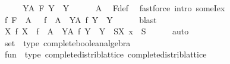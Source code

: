 \begin{isabellebody}
\ \ \isamarkupfalse%
\ \isamarkupfalse%
\ {\isachardoublequoteopen}{\isasymforall}Y{\isasymin}A{\isachardot}{\kern0pt}\ F\ Y\ {\isasymin}\ Y{\isachardoublequoteclose}\isanewline
\ \ \ \ \isamarkupfalse%
\ A\ \isamarkupfalse%
\ F{\isacharunderscore}{\kern0pt}def\ \isamarkupfalse%
\ {\isacharparenleft}{\kern0pt}fastforce\ intro{\isacharcolon}{\kern0pt}\ someI{}{\isacharunderscore}{\kern0pt}ex{\isacharparenright}{\kern0pt}\isanewline
\ \ \isamarkupfalse%
\ \isamarkupfalse%
\ {\isachardoublequoteopen}{\isasymexists}f{\isachardot}{\kern0pt}\ F\ {\isacharbackquote}{\kern0pt}\ A\ \ {\isacharequal}{\kern0pt}\ f\ {\isacharbackquote}{\kern0pt}\ A\ {\isasymand}\ {\isacharparenleft}{\kern0pt}{\isasymforall}Y{\isasymin}A{\isachardot}{\kern0pt}\ f\ Y\ {\isasymin}\ Y{\isacharparenright}{\kern0pt}{\isachardoublequoteclose}\isanewline
\ \ \ \ \isamarkupfalse%
\ blast\isanewline
\ \ \isamarkupfalse%
\ \isamarkupfalse%
\ {\isachardoublequoteopen}{\isasymexists}X{\isachardot}{\kern0pt}\ {\isacharparenleft}{\kern0pt}{\isasymexists}f{\isachardot}{\kern0pt}\ X\ {\isacharequal}{\kern0pt}\ f\ {\isacharbackquote}{\kern0pt}\ A\ {\isasymand}\ {\isacharparenleft}{\kern0pt}{\isasymforall}Y{\isasymin}A{\isachardot}{\kern0pt}\ f\ Y\ {\isasymin}\ Y{\isacharparenright}{\kern0pt}{\isacharparenright}{\kern0pt}\ {\isasymand}\ {\isacharparenleft}{\kern0pt}{\isasymforall}S{\isasymin}X{\isachardot}{\kern0pt}\ x\ {\isasymin}\ S{\isacharparenright}{\kern0pt}{\isachardoublequoteclose}\isanewline
\ \ \ \ \isamarkupfalse%
\ auto\isanewline
{}\isamarkupfalse%
%
\endisatagproof
{\isafoldproof}%
%
\isadelimproof
%
\endisadelimproof
\isanewline
{}\isamarkupfalse%
\isanewline
\isanewline
{}\isamarkupfalse%
\ set\ {\isacharcolon}{\kern0pt}{\isacharcolon}{\kern0pt}\ {\isacharparenleft}{\kern0pt}type{\isacharparenright}{\kern0pt}\ complete{\isacharunderscore}{\kern0pt}boolean{\isacharunderscore}{\kern0pt}algebra%
\isadelimproof
\ %
\endisadelimproof
%
\isatagproof
\isacommand{{\isachardot}{\kern0pt}{\isachardot}{\kern0pt}}\isamarkupfalse%
%
\endisatagproof
{\isafoldproof}%
%
\isadelimproof
%
\endisadelimproof
\isanewline
\isanewline
{}\isamarkupfalse%
\ {\isachardoublequoteopen}fun{\isachardoublequoteclose}\ {\isacharcolon}{\kern0pt}{\isacharcolon}{\kern0pt}\ {\isacharparenleft}{\kern0pt}type{\isacharcomma}{\kern0pt}\ complete{\isacharunderscore}{\kern0pt}distrib{\isacharunderscore}{\kern0pt}lattice{\isacharparenright}{\kern0pt}\ complete{\isacharunderscore}{\kern0pt}distrib{\isacharunderscore}{\kern0pt}lattice\isanewline

\end{isabellebody}

